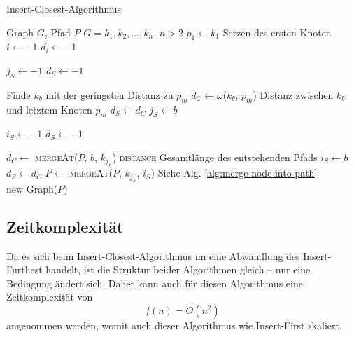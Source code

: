 \begin{algorithm}
    \caption{Insert-Closest-Algorithmus}
    \label{alg:insert-closest}
    \begin{algorithmic}[1]
        \Require Graph $G$, Pfad $P$
        \Require $G = k_1,k_2,\ldots,k_n$, $n > 2$
        \State $p_1 \gets k_1$
        \Comment Setzen des ersten Knoten
        \State $i \gets -1$
        \State $d_i \gets -1$

            \State $j_S \gets -1$
            \State $d_S \gets -1$

                \Comment Finde $k_b$ mit der geringsten Distanz zu $p_m$
                \State $d_C \gets \omega$($k_b$, $p_m$)
                \Comment Distanz zwischen $k_b$ und letztem Knoten $p_m$
                    \State $d_S \gets d_C$
                    \State $j_S \gets b$
                \EndIf
            \EndFor

            \State $i_S \gets -1$
            \State $d_S \gets -1$

                \State $d_C \gets$ \textsc{mergeAt}($P$, $b$, $k_{j_F}$) \textsc{distance}
                \Comment Gesamtlänge des entstehenden Pfads
                    \State $i_S \gets b$
                    \State $d_S \gets d_C$
                \EndIf
            \EndFor
            \State $P \gets$ \textsc{mergeAt}($P$, $k_{j_S}$, $i_S$)
            \Comment Siehe Alg. \vref{alg:merge-node-into-path}
        \EndFor \\
        \Return new Graph($P$)
    \end{algorithmic}
\end{algorithm}

\subsection{Zeitkomplexität}
Da es sich beim Insert-Closest-Algorithmus im eine Abwandlung des Insert-Furthest handelt, ist die Struktur beider Algorithmen gleich -- nur eine Bedingung ändert sich.
Daher kann auch für diesen Algorithmus eine Zeitkomplexität von 
$$f(n) = O(n^2)$$ 
angenommen werden, womit auch dieser Algorithmus wie Insert-First skaliert.

